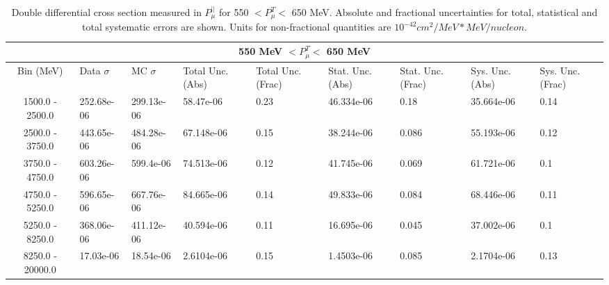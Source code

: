 \begin{table}[!htb]
    \centering
    \tiny
    \begin{tabular}{|c|p{0.5in}|p{0.5in}|p{0.5in}|p{0.5in}|p{0.5in}|p{0.5in}|p{0.5in}|p{0.5in}|}

        \hline
        \multicolumn{9}{c}{550 MeV $ < P^T_\mu < $ 650 MeV}\\
        \hline
        Bin (MeV)& Data $\sigma$ & MC $\sigma$ & Total Unc. (Abs) & Total Unc. (Frac)  & Stat. Unc. (Abs) & Stat. Unc. (Frac) & Sys. Unc. (Abs) & Sys. Unc. (Frac)\\ \hline
1500.0 - 2500.0 & 252.68e-06 & 299.13e-06 & 58.47e-06 & 0.23 & 46.334e-06 & 0.18 & 35.664e-06 & 0.14\\ \hline
2500.0 - 3750.0 & 443.65e-06 & 484.28e-06 & 67.148e-06 & 0.15 & 38.244e-06 & 0.086 & 55.193e-06 & 0.12\\ \hline
3750.0 - 4750.0 & 603.26e-06 & 599.4e-06 & 74.513e-06 & 0.12 & 41.745e-06 & 0.069 & 61.721e-06 & 0.1\\ \hline
4750.0 - 5250.0 & 596.65e-06 & 667.76e-06 & 84.665e-06 & 0.14 & 49.833e-06 & 0.084 & 68.446e-06 & 0.11\\ \hline
5250.0 - 8250.0 & 368.06e-06 & 411.12e-06 & 40.594e-06 & 0.11 & 16.695e-06 & 0.045 & 37.002e-06 & 0.1\\ \hline
8250.0 - 20000.0 & 17.03e-06 & 18.54e-06 & 2.6104e-06 & 0.15 & 1.4503e-06 & 0.085 & 2.1704e-06 & 0.13\\ \hline


    \end{tabular}
    \caption{Double differential cross section measured in $P^{||}_\mu$ for 550 $ < P^T_\mu < $ 650 MeV. Absolute and fractional uncertainties for total, statistical and total systematic errors are shown. Units for non-fractional quantities are $10^{-42}cm^2/MeV*MeV/nucleon$.}
    \label{tab:ApdxA:XSecTable2Dpzmuptmu5}
\end{table}


